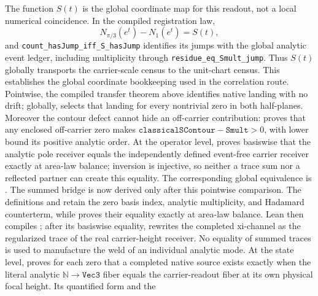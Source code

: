 The function \(S(t)\) is the global coordinate map for this readout, not a
local numerical coincidence.  In the compiled registration law,
\[
 N_{\pi/3}(e^t)-N_1(e^t)=S(t),
\]
and \texttt{count\_hasJump\_iff\_S\_hasJump} identifies its jumps with the
global analytic event ledger, including multiplicity through
\texttt{residue\_eq\_Smult\_jump}.  Thus \(S(t)\) globally transports the
carrier-scale census to the unit-chart census.  This establishes the global
coordinate bookkeeping used in the correlation route.  Pointwise, the
compiled transfer theorem above identifies native landing with no drift;
globally,  selects that
landing for every nontrivial zero in both half-planes.
Moreover the contour defect cannot hide an off-carrier contribution:
 proves that any enclosed
off-carrier zero makes
\(\texttt{classicalSContour}-\texttt{Smult}>0\), with lower bound its positive
analytic order.  At the operator level,
 proves
basiswise that the analytic pole receiver equals the independently defined
event-free carrier receiver exactly at area-law balance; inversion is
injective, so neither a trace sum nor a reflected partner can create this
equality.  The corresponding global equivalence is
.
The summed bridge is now derived only after this pointwise comparison.  The
definitions  and
 retain the zero basis index, analytic
multiplicity, and Hadamard counterterm, while
 proves
their equality exactly at area-law balance.  Lean then compiles
;
after its basiswise equality,
 rewrites
the completed xi-channel as the regularized trace of the real carrier-height
receiver.  No equality of summed traces is used to manufacture the weld of an
individual analytic mode.
At the state level,
proves for each zero that a completed native source exists exactly when the
literal analytic \(\mathbb N\to\texttt{Vec3}\) fiber equals the carrier-readout
fiber at its own physical focal height.  Its quantified form
 and the
